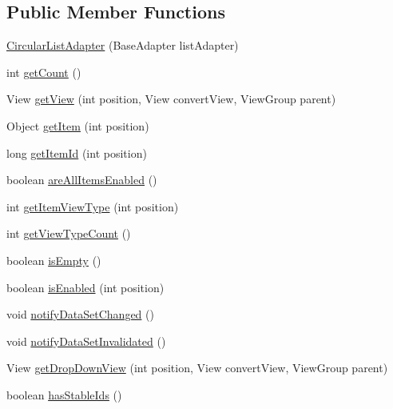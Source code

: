 \subsection*{Public Member Functions}
\begin{DoxyCompactItemize}
\item 
\hyperlink{classcom_1_1video__browser__thesis_1_1adapters_1_1_circular_list_adapter_a732793d0d75fa47e276b10be2b68e251}{Circular\-List\-Adapter} (Base\-Adapter list\-Adapter)
\item 
int \hyperlink{classcom_1_1video__browser__thesis_1_1adapters_1_1_circular_list_adapter_a08af2c2190d6dafcb6125cd6087994c7}{get\-Count} ()
\item 
View \hyperlink{classcom_1_1video__browser__thesis_1_1adapters_1_1_circular_list_adapter_a2bb3131802d928557b95f5de888f20b4}{get\-View} (int position, View convert\-View, View\-Group parent)
\item 
Object \hyperlink{classcom_1_1video__browser__thesis_1_1adapters_1_1_circular_list_adapter_ae0b6ace4a8cc59cce04de5b05e723983}{get\-Item} (int position)
\item 
long \hyperlink{classcom_1_1video__browser__thesis_1_1adapters_1_1_circular_list_adapter_a53c6fa48f2029148d1a2af1baba6650b}{get\-Item\-Id} (int position)
\item 
boolean \hyperlink{classcom_1_1video__browser__thesis_1_1adapters_1_1_circular_list_adapter_a74f9667e98d65f19dceb04acade4f7f8}{are\-All\-Items\-Enabled} ()
\item 
int \hyperlink{classcom_1_1video__browser__thesis_1_1adapters_1_1_circular_list_adapter_a41062b03f04e8c6a4deb5c575a4f843d}{get\-Item\-View\-Type} (int position)
\item 
int \hyperlink{classcom_1_1video__browser__thesis_1_1adapters_1_1_circular_list_adapter_a7851bffb1fc27671cfa7b302f6c356a8}{get\-View\-Type\-Count} ()
\item 
boolean \hyperlink{classcom_1_1video__browser__thesis_1_1adapters_1_1_circular_list_adapter_a678d75a644407a081b7ceed5bdf36c5c}{is\-Empty} ()
\item 
boolean \hyperlink{classcom_1_1video__browser__thesis_1_1adapters_1_1_circular_list_adapter_a8ed502dfae802d67369dd6a8acd69b0c}{is\-Enabled} (int position)
\item 
void \hyperlink{classcom_1_1video__browser__thesis_1_1adapters_1_1_circular_list_adapter_ae4409d3fa4355d3ce0fba3a4bc9d5e7a}{notify\-Data\-Set\-Changed} ()
\item 
void \hyperlink{classcom_1_1video__browser__thesis_1_1adapters_1_1_circular_list_adapter_a7343853ce6edde37387315c9741117d5}{notify\-Data\-Set\-Invalidated} ()
\item 
View \hyperlink{classcom_1_1video__browser__thesis_1_1adapters_1_1_circular_list_adapter_af17c8ac108e8cacc75f389af3d645248}{get\-Drop\-Down\-View} (int position, View convert\-View, View\-Group parent)
\item 
boolean \hyperlink{classcom_1_1video__browser__thesis_1_1adapters_1_1_circular_list_adapter_a54a7111717492834a07e6fd5e757282a}{has\-Stable\-Ids} ()
\end{DoxyCompactItemize}


